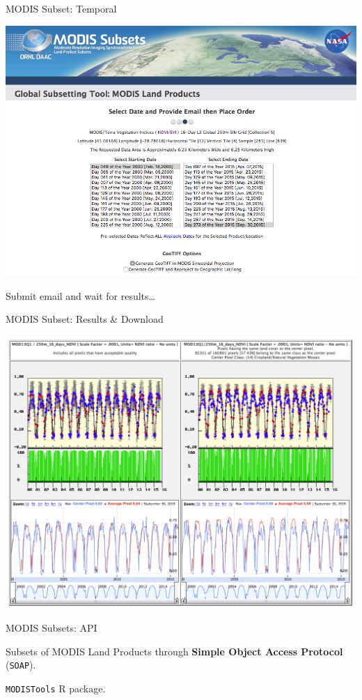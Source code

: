\documentclass[ignorenonframetext,]{beamer}
\begin{document}
\begin{frame}{MODIS Subset: Temporal}

\includegraphics{assets/mws0c.png}

Submit email and wait for results\ldots{}

\end{frame}

\begin{frame}{MODIS Subset: Results \& Download}

\includegraphics{assets/mws1.png}

\end{frame}

\begin{frame}{MODIS Subsets: API}

Subsets of MODIS Land Products through \textbf{Simple Object Access
Protocol} (\texttt{SOAP}).

\texttt{MODISTools} R package.

\end{frame}
\end{document}
